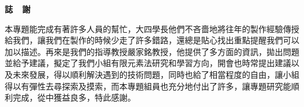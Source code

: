 \documentclass[14pt,a4paper]{report}  %
\begin{document}

\newpage
\centerline\LARGE\textbf{誌~~謝}\\
\begin{flushleft}
\fontsize{14pt}{2.5pt}\hspace{12pt}\quad 本專題能完成有著許多人員的幫忙，大四學長他們不吝嗇地將往年的製作經驗傳授給我們，讓我們在製作的時候少走了許多錯路，還總是貼心找出重點提醒我們可以加以描述。再來是我們的指導教授嚴家銘教授，他提供了多方面的資訊，拋出問題並給予建議，擬定了我們小組有限元素法研究和學習方向，開會也時常提出建議以及未來發展，得以順利解決遇到的技術問題，同時也給了相當程度的自由，讓小組得以有彈性去尋探索及摸索，而本專題組員也充分地付出了許多，讓專題研究能順利完成，從中獲益良多，特此感謝。
\newpage
\renewcommand{\contentsname}{\centerline{\fontsize{18pt}{\baselineskip}\selectfont\textbf{目\quad 錄}}}
\tableofcontents　　%
\newpage
\renewcommand{\listfigurename}{\centerline{\fontsize{18pt}{\baselineskip}\selectfont\textbf{圖\quad 目\quad 錄 }}}
\newcommand{\loflabel}{圖} %
\renewcommand{\numberline}[1]{\loflabel~#1\hspace*{0.5em}}
\listoffigures
\newpage
\renewcommand{\listtablename}{\centerline{\fontsize{18pt}{\baselineskip}\selectfont\textbf{表\quad 目\quad 錄 }}}
\newcommand{\lotlabel}{表} %
\renewcommand{\numberline}[1]{\lotlabel~#1\hspace*{0.5em}}
\listoftables


\end{flushleft}
\end{document}
